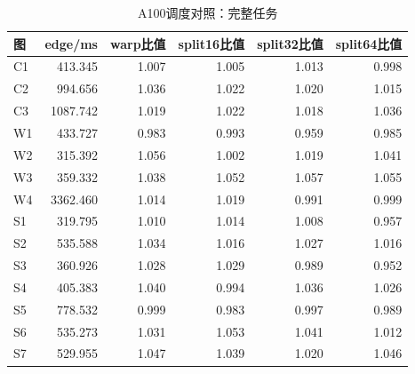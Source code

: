 \begin{table}[htbp]
\centering
\small
\caption{A100调度对照：完整任务}\label{tab:a100_full}
\begin{tabular}{lrrrrr}
\toprule
图 & edge/ms & warp比值 & split16比值 & split32比值 & split64比值 \\
\midrule
C1 & 413.345 & 1.007 & 1.005 & 1.013 & 0.998 \\
C2 & 994.656 & 1.036 & 1.022 & 1.020 & 1.015 \\
C3 & 1087.742 & 1.019 & 1.022 & 1.018 & 1.036 \\
W1 & 433.727 & 0.983 & 0.993 & 0.959 & 0.985 \\
W2 & 315.392 & 1.056 & 1.002 & 1.019 & 1.041 \\
W3 & 359.332 & 1.038 & 1.052 & 1.057 & 1.055 \\
W4 & 3362.460 & 1.014 & 1.019 & 0.991 & 0.999 \\
S1 & 319.795 & 1.010 & 1.014 & 1.008 & 0.957 \\
S2 & 535.588 & 1.034 & 1.016 & 1.027 & 1.016 \\
S3 & 360.926 & 1.028 & 1.029 & 0.989 & 0.952 \\
S4 & 405.383 & 1.040 & 0.994 & 1.036 & 1.026 \\
S5 & 778.532 & 0.999 & 0.983 & 0.997 & 0.989 \\
S6 & 535.273 & 1.031 & 1.053 & 1.041 & 1.012 \\
S7 & 529.955 & 1.047 & 1.039 & 1.020 & 1.046 \\
\bottomrule
\end{tabular}
\par{}
\end{table}
